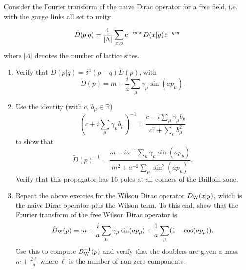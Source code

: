 Consider the Fourier transform of the naive Dirac operator for a free field, i.e. with the gauge links all set to unity

\begin{equation}
	\tilde{D}(p|q) = \frac{1}{|\Lambda|} \sum_{x,y} {\rm e}^{-ip\cdot x} \, D(x|y) \, {\rm e}^{-q\cdot y}
\end{equation}
where $|\Lambda|$ denotes the number of lattice sites.
\begin{enumerate}
	\item Verify that $\tilde{D}(p|q) = \delta^4(p-q) \tilde{D}(p)$, with
	      \begin{equation}
		      \tilde{D}(p) = m + \frac{i}{a} \sum_{\mu} \gamma_\mu \sin(ap_\mu).
	      \end{equation}
	\item Use the identity (with $c,\, b_{\mu} \in \mathbb{R}$)
	      \begin{equation}
		      \left( c + i\sum_{\mu} \gamma_\mu b_\mu \right)^{-1} = \frac{c - i\sum_\mu \gamma_\mu b_{\mu}}{c^2 + \sum_\mu b_\mu^2}
	      \end{equation}
	      to show that
	      \begin{equation}
		      \tilde{D}(p)^{-1} = \frac{m - ia^{-1}\sum_{\mu} \gamma_\mu \sin(ap_{\mu})}{m^2 + a^{-2}\sum_\mu \sin^{2}(ap_{\mu})}.
	      \end{equation}
	      Verify that this propagator has 16 poles at all corners of the Brilloin zone.
	\item Repeat the above exercies for the Wilson Dirac operator $D_{\rm W}(x|y)$, which is the naive Dirac operator plus the Wilson term. To this end, show that the Fourier transform of the free Wilson Dirac operator is
	      \begin{equation}
		      \tilde{D}_{\rm W}(p) = m + \frac{i}{a}\sum_{\mu} \gamma_{\mu}\sin(ap_\mu) +
		      \frac{1}{a} \sum_{\mu} (1 - \cos(ap_\mu)).
	      \end{equation}
	      Use this to compute $\tilde{D}_{\rm W}^{-1}(p)$ and verify that the doublers are given a mass $m + \frac{2\ell}{a}$ where $\ell$ is the number of non-zero components.
\end{enumerate}